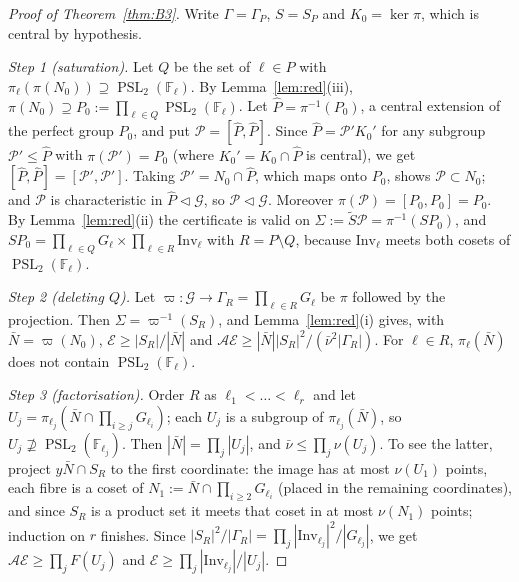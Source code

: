 \documentclass[11pt]{amsart}
\theoremstyle{definition}
\theoremstyle{remark}
\newcommand{\F}{\mathbb{F}}
\DeclareMathOperator{\PSL}{PSL}
\newcommand{\Inv}{\mathrm{Inv}}
\newcommand{\cA}{\mathcal{A}}      %
\newcommand{\cE}{\mathcal{E}}      %
\newcommand{\cG}{\mathcal{G}}      %
\begin{document}
\begin{proof}[Proof of Theorem~\ref{thm:B3}]
Write $\Gamma=\Gamma_P$, $S=S_P$ and $K_0=\ker\pi$, which is central by hypothesis.

\emph{Step 1 (saturation).} Let $Q$ be the set of $\ell\in P$ with $\pi_\ell(\pi(N_0))\supseteq\PSL_2(\F_\ell)$. By
Lemma~\ref{lem:red}(iii), $\pi(N_0)\supseteq P_0:=\prod_{\ell\in Q}\PSL_2(\F_\ell)$. Let $\widehat P=\pi^{-1}(P_0)$, a
central extension of the perfect group $P_0$, and put $\mathcal P=[\widehat P,\widehat P]$. Since $\widehat P=\mathcal
P'K_0'$ for any subgroup $\mathcal P'\le\widehat P$ with $\pi(\mathcal P')=P_0$ (where $K_0'=K_0\cap\widehat P$ is
central), we get $[\widehat P,\widehat P]=[\mathcal P',\mathcal P']$. Taking $\mathcal P'=N_0\cap\widehat P$, which maps
onto $P_0$, shows $\mathcal P\subset N_0$; and $\mathcal P$ is characteristic in $\widehat P\lhd\cG$, so
$\mathcal P\lhd\cG$. Moreover $\pi(\mathcal P)=[P_0,P_0]=P_0$. By Lemma~\ref{lem:red}(ii) the certificate is valid on
$\Sigma:=\widetilde S\mathcal P=\pi^{-1}(SP_0)$, and $SP_0=\prod_{\ell\in Q}G_\ell\times\prod_{\ell\in R}\Inv_\ell$
with $R=P\setminus Q$, because $\Inv_\ell$ meets both cosets of $\PSL_2(\F_\ell)$.

\emph{Step 2 (deleting $Q$).} Let $\varpi:\cG\to\Gamma_R=\prod_{\ell\in R}G_\ell$ be $\pi$ followed by the
projection. Then $\Sigma=\varpi^{-1}(S_R)$, and Lemma~\ref{lem:red}(i) gives, with $\bar N=\varpi(N_0)$,
$\cE\ge|S_R|/|\bar N|$ and $\cA\cE\ge|\bar N||S_R|^2/(\bar\nu^2|\Gamma_R|)$. For $\ell\in R$, $\pi_\ell(\bar N)$ does
not contain $\PSL_2(\F_\ell)$.

\emph{Step 3 (factorisation).} Order $R$ as $\ell_1<\dots<\ell_r$ and let
$U_j=\pi_{\ell_j}(\bar N\cap\prod_{i\ge j}G_{\ell_i})$; each $U_j$ is a subgroup of $\pi_{\ell_j}(\bar N)$, so
$U_j\not\supseteq\PSL_2(\F_{\ell_j})$. Then $|\bar N|=\prod_j|U_j|$, and $\bar\nu\le\prod_j\nu(U_j)$. To see the latter,
project $y\bar N\cap S_R$ to the first coordinate: the image has at most $\nu(U_1)$ points, each fibre is a coset of
$N_1:=\bar N\cap\prod_{i\ge2}G_{\ell_i}$ (placed in the remaining coordinates), and since $S_R$ is a product set it
meets that coset in at most $\nu(N_1)$ points; induction on $r$ finishes. Since
$|S_R|^2/|\Gamma_R|=\prod_j|\Inv_{\ell_j}|^2/|G_{\ell_j}|$, we get $\cA\cE\ge\prod_jF(U_j)$ and
$\cE\ge\prod_j|\Inv_{\ell_j}|/|U_j|$.


\end{proof}
\end{document}
